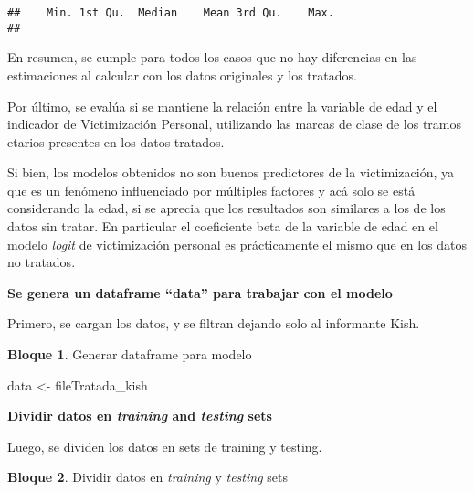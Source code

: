 \documentclass[
]{book}
\newenvironment{Shaded}{\begin{snugshade}}{\end{snugshade}}
\newcommand{\NormalTok}[1]{#1}
\newcommand{\OtherTok}[1]{\textcolor[rgb]{0.56,0.35,0.01}{#1}}
\theoremstyle{definition}
\theoremstyle{definition}
\newtheorem{example}{Bloque}[chapter]
\theoremstyle{definition}
\theoremstyle{definition}
\theoremstyle{remark}
\begin{document}
\begin{verbatim}
##    Min. 1st Qu.  Median    Mean 3rd Qu.    Max. 
## 
\end{verbatim}

En resumen, se cumple para todos los casos que no hay diferencias en las estimaciones al calcular con los datos originales y los tratados.

Por último, se evalúa si se mantiene la relación entre la variable de edad y el indicador de Victimización Personal, utilizando las marcas de clase de los tramos etarios presentes en los datos tratados.

Si bien, los modelos obtenidos no son buenos predictores de la victimización, ya que es un fenómeno influenciado por múltiples factores y acá solo se está considerando la edad, si se aprecia que los resultados son similares a los de los datos sin tratar. En particular el coeficiente beta de la variable de edad en el modelo \emph{logit} de victimización personal es prácticamente el mismo que en los datos no tratados.

\textbf{Se genera un dataframe ``data'' para trabajar con el modelo}

Primero, se cargan los datos, y se filtran dejando solo al informante Kish.

\begin{example}
\protect\hypertarget{exm:bloque80nbm}{}\label{exm:bloque80nbm}Generar dataframe para modelo
\end{example}

\begin{Shaded}
\begin{Highlighting}[]
\NormalTok{data }\OtherTok{\textless{}{-}}\NormalTok{ fileTratada\_kish}
\end{Highlighting}
\end{Shaded}

\textbf{Dividir datos en \emph{training} and \emph{testing} sets}

Luego, se dividen los datos en sets de training y testing.

\begin{example}
\protect\hypertarget{exm:bloque81nbm}{}\label{exm:bloque81nbm}Dividir datos en \emph{training} y \emph{testing} sets
\end{example}
\end{document}
